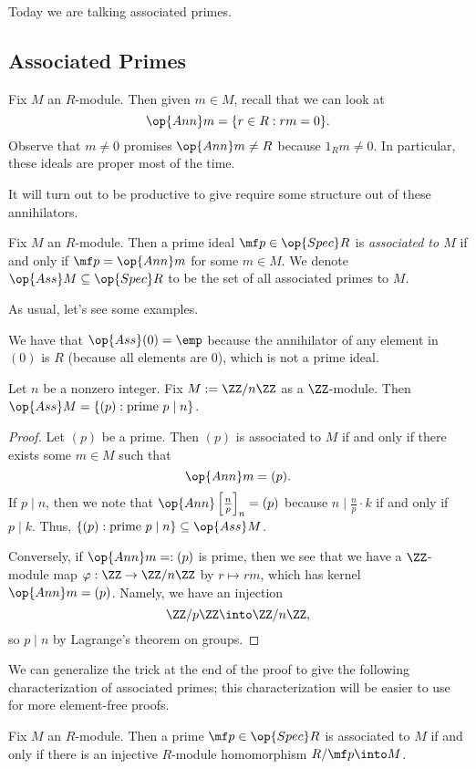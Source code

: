 
Today we are talking associated primes.

\subsection{Associated Primes}
Fix $M$ an $R$-module. Then given $m\in M$, recall that we can look at
\[\op{Ann}m=\{r\in R:rm=0\}.\]
Observe that $m\ne0$ promises $\op{Ann}m\ne R$ because $1_Rm\ne0$. In particular, these ideals are proper most of the time.

It will turn out to be productive to give require some structure out of these annihilators.
\begin{definition}
	Fix $M$ an $R$-module. Then a prime ideal $\mf p\in\op{Spec}R$ is \textit{associated to $M$} if and only if $\mf p=\op{Ann}m$ for some $m\in M$. We denote $\op{Ass}M\subseteq\op{Spec}R$ to be the set of all associated primes to $M$.
\end{definition}
As usual, let's see some examples.
\begin{example}
	We have that $\op{Ass}(0)=\emp$ because the annihilator of any element in $(0)$ is $R$ (because all elements are $0$), which is not a prime ideal.
\end{example}
\begin{exe} \label{exe:cyclicassociated}
	Let $n$ be a nonzero integer. Fix $M:=\ZZ/n\ZZ$ as a $\ZZ$-module. Then $\op{Ass}M=\{(p):\text{prime }p\mid n\}$.
\end{exe}
\begin{proof}
	Let $(p)$ be a prime. Then $(p)$ is associated to $M$ if and only if there exists some $m\in M$ such that
	\[\op{Ann}m=(p).\]
	If $p\mid n$, then we note that $\op{Ann}\left[\frac np\right]_n=(p)$ because $n\mid\frac np\cdot k$ if and only if $p\mid k$. Thus, $\{(p):\text{prime }p\mid n\}\subseteq\op{Ass}M$.
	
	Conversely, if $\op{Ann}m=:(p)$ is prime, then we see that we have a $\ZZ$-module map $\varphi:\ZZ\to\ZZ/n\ZZ$ by $r\mapsto rm$, which has kernel $\op{Ann}m=(p)$. Namely, we have an injection
	\[\ZZ/p\ZZ\into\ZZ/n\ZZ,\]
	so $p\mid n$ by Lagrange's theorem on groups.
\end{proof}
We can generalize the trick at the end of the proof to give the following characterization of associated primes; this characterization will be easier to use for more element-free proofs.
\begin{lemma} \label{lem:betterassociated}
	Fix $M$ an $R$-module. Then a prime $\mf p\in\op{Spec}R$ is associated to $M$ if and only if there is an injective $R$-module homomorphism $R/\mf p\into M$.
\end{lemma}
